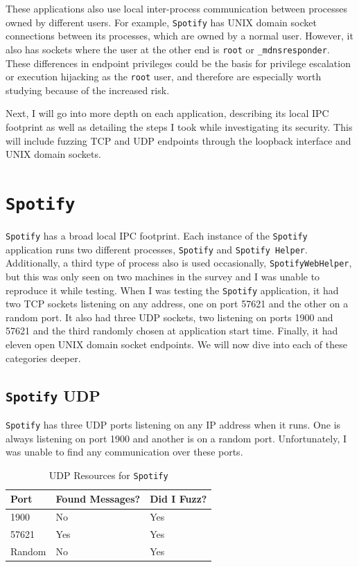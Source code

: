 These applications also use local inter-process communication between processes owned by different users.  For example, \texttt{Spotify} has UNIX domain socket connections between its processes, which are owned by a normal user.  However, it also has sockets where the user at the other end is \texttt{root} or \texttt{\_mdnsresponder}.  These differences in endpoint privileges could be the basis for privilege escalation or execution hijacking as the \texttt{root} user, and therefore are especially worth studying because of the increased risk.

Next, I will go into more depth on each application, describing its local IPC footprint as well as detailing the steps I took while investigating its security.  This will include fuzzing TCP and UDP endpoints through the loopback interface and UNIX domain sockets.

\section{\texttt{Spotify}}
\label{sec:spotify}
\texttt{Spotify} has a broad local IPC footprint.  Each instance of the \texttt{Spotify} application runs two different processes, \texttt{Spotify} and \texttt{Spotify Helper}.  Additionally, a third type of process also is used occasionally, \texttt{SpotifyWebHelper}, but this was only seen on two machines in the survey and I was unable to reproduce it while testing.  When I was testing the \texttt{Spotify} application, it had two TCP sockets listening on any address, one on port 57621 and the other on a random port.  It also had three UDP sockets, two listening on ports 1900 and 57621 and the third randomly chosen at application start time.  Finally, it had eleven open UNIX domain socket endpoints.  We will now dive into each of these categories deeper.

\subsection{\texttt{Spotify} UDP}
\label{sec:spotifyUdp}
\texttt{Spotify} has three UDP ports listening on any IP address when it runs.  One is always listening on port 1900 and another is on a random port.  Unfortunately, I was unable to find any communication over these ports.

\begin{table}
\centering
\begin{normalsize}
\begin{tabular}{ l | l | l }
\textbf{Port} & \textbf{Found Messages?} & \textbf{Did I Fuzz?} \\ \hline
1900 & No & Yes \\ \hline
57621 & Yes & Yes \\ \hline
Random & No & Yes \\ \hline
\end{tabular}
\caption{UDP Resources for \texttt{Spotify}}
\label{tab:spotifyUdpTab}
\end{normalsize}
\end{table} 


